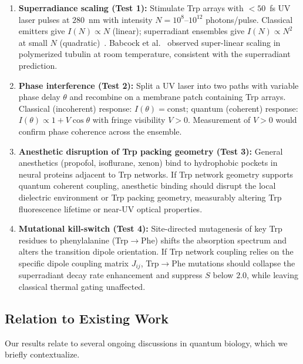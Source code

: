 \documentclass[aps,pre,twocolumn,showpacs,superscriptaddress]{revtex4-2}
\begin{document}
\begin{enumerate}
\item \textbf{Superradiance scaling (Test 1):} Stimulate Trp arrays with $<50$~fs UV laser pulses at $280$~nm with intensity $N = 10^8$--$10^{12}$ photons/pulse. Classical emitters give $I(N) \propto N$ (linear); superradiant ensembles give $I(N) \propto N^2$ at small $N$ (quadratic)~\cite{Dicke1954}. Babcock et al.~\cite{Babcock2024} observed super-linear scaling in polymerized tubulin at room temperature, consistent with the superradiant prediction.

\item \textbf{Phase interference (Test 2):} Split a UV laser into two paths with variable phase delay $\theta$ and recombine on a membrane patch containing Trp arrays. Classical (incoherent) response: $I(\theta) = \mathrm{const}$; quantum (coherent) response: $I(\theta) \propto 1 + V\cos\theta$ with fringe visibility $V > 0$. Measurement of $V > 0$ would confirm phase coherence across the ensemble.

\item \textbf{Anesthetic disruption of Trp packing geometry (Test 3):} General anesthetics (propofol, isoflurane, xenon) bind to hydrophobic pockets in neural proteins adjacent to Trp networks. If Trp network geometry supports quantum coherent coupling, anesthetic binding should disrupt the local dielectric environment or Trp packing geometry, measurably altering Trp fluorescence lifetime or near-UV optical properties.

\item \textbf{Mutational kill-switch (Test 4):} Site-directed mutagenesis of key Trp residues to phenylalanine (Trp$\to$Phe) shifts the absorption spectrum and alters the transition dipole orientation. If Trp network coupling relies on the specific dipole coupling matrix $J_{ij}$, Trp$\to$Phe mutations should collapse the superradiant decay rate enhancement and suppress $S$ below $2.0$, while leaving classical thermal gating unaffected.
\end{enumerate}





\subsection{Relation to Existing Work}

Our results relate to several ongoing discussions in quantum biology, which we briefly contextualize.
\end{document}
